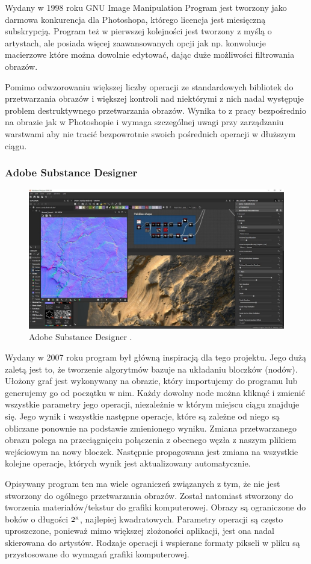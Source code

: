 Wydany w 1998 roku GNU Image Manipulation Program jest tworzony jako darmowa konkurencja dla Photoshopa, którego licencja jest miesięczną subskrypcją. Program też w pierwszej kolejności jest tworzony z myślą o artystach, ale posiada więcej zaawansowanych opcji jak np. konwolucje macierzowe które można dowolnie edytować, dając duże możliwości filtrowania obrazów.

Pomimo odwzorowaniu większej liczby operacji ze standardowych bibliotek do przetwarzania obrazów i większej kontroli nad niektórymi z nich nadal występuje problem destruktywnego przetwarzania obrazów. Wynika to z pracy bezpośrednio na obrazie jak w Photoshopie i wymaga szczególnej uwagi przy zarządzaniu warstwami aby nie tracić bezpowrotnie swoich pośrednich operacji w dłuższym ciągu.

\subsubsection{Adobe Substance Designer}
\begin{figure}[H]
    \centering
    \includegraphics{./images/Picture6.jpg}
    \caption{Adobe Substance Designer \cite{designer}.}
    \label{fig:designer}
\end{figure}

Wydany w 2007 roku program był główną inspiracją dla tego projektu. 
Jego dużą zaletą jest to, że tworzenie algorytmów bazuje na układaniu bloczków (nodów). 
Ułożony graf jest wykonywany na obrazie, który importujemy do programu lub generujemy go od początku w nim. 
Każdy dowolny node można kliknąć i zmienić wszystkie parametry jego operacji, niezależnie w którym miejscu ciągu znajduje się.
Jego wynik i wszystkie następne operacje, które są zależne od niego są obliczane ponownie na podstawie zmienionego wyniku. 
Zmiana przetwarzanego obrazu polega na przeciągnięciu połączenia z obecnego węzła z naszym plikiem wejściowym na nowy bloczek. Następnie propagowana jest zmiana na wszystkie kolejne operacje, których wynik jest aktualizowany automatycznie.

Opisywany program ten ma wiele ograniczeń związanych z tym, że nie jest stworzony do ogólnego przetwarzania obrazów. Został natomiast stworzony do tworzenia materiałów/tekstur do grafiki komputerowej. 
Obrazy są ograniczone do boków o długości $2\textsuperscript{n}$, najlepiej kwadratowych. 
Parametry operacji są często uproszczone, ponieważ mimo większej złożoności aplikacji, jest ona nadal skierowana do artystów. 
Rodzaje operacji i wspierane formaty pikseli w pliku są przystosowane do wymagań grafiki komputerowej.
